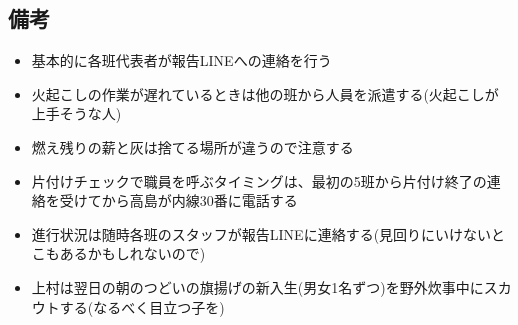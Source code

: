 \subsection{備考}
\begin{itemize}
\item 基本的に各班代表者が報告LINEへの連絡を行う
\item 火起こしの作業が遅れているときは他の班から人員を派遣する(火起こしが上手そうな人)
\item 燃え残りの薪と灰は捨てる場所が違うので注意する
\item 片付けチェックで職員を呼ぶタイミングは、最初の5班から片付け終了の連絡を受けてから高島が内線30番に電話する
\item 進行状況は随時各班のスタッフが報告LINEに連絡する(見回りにいけないとこもあるかもしれないので)
\item 上村は翌日の朝のつどいの旗揚げの新入生(男女1名ずつ)を野外炊事中にスカウトする(なるべく目立つ子を)
\end{itemize}


%
